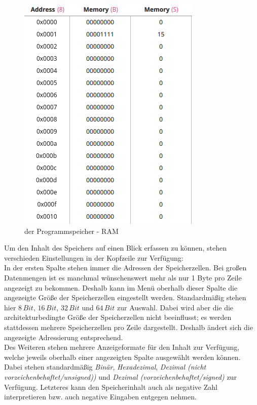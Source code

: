 \begin{figure}[ht]
	\centering
  \includegraphics[scale=1]{Images/Memory}
	\caption{der Programmspeicher - RAM}
	\label{Memory}
\end{figure}

Um den Inhalt des Speichers auf einen Blick erfassen zu können, stehen
verschieden Einstellungen in der Kopfzeile zur Verfügung:\\ In der ersten Spalte
stehen immer die Adressen der Speicherzellen. Bei großen Datenmengen ist es
manchmal wünschenswert mehr als nur 1 Byte pro Zeile angezeigt zu bekommen.
Deshalb kann im Menü oberhalb dieser Spalte die angezeigte Größe der
Speicherzellen eingestellt werden. Standardmäßig stehen hier $8\, Bit$, $16\,
Bit$, $32\, Bit$ und $64\, Bit$ zur Auswahl. Dabei wird aber die die
architekturbedingte Größe der Speicherzellen nicht beeinflusst; es werden
stattdessen mehrere Speicherzellen pro Zeile dargestellt. Deshalb ändert sich
die angezeigte Adressierung entsprechend.\\ Des Weiteren stehen mehrere
Anzeigeformate für den Inhalt zur Verfügung, welche jeweils oberhalb einer
angezeigten Spalte ausgewählt werden können. Dabei stehen standardmäßig
\textit{Binär}, \textit{Hexadezimal}, \textit{Dezimal (nicht vorzeichenbehaftet/unsigned))} und \textit{Dezimal (vorzeichenbehaftet/signed)} zur Verfügung. Letzteres kann den Speicherinhalt
auch als negative Zahl interpretieren bzw. auch negative Eingaben entgegen
nehmen. \\

